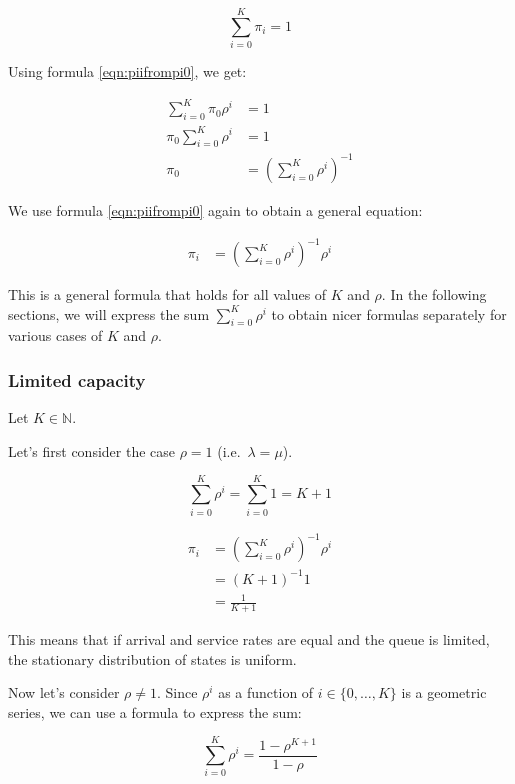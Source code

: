 \documentclass{article}
\begin{document}
\begin{equation}
\sum_{i=0}^K \pi_i = 1
\end{equation}

Using formula \ref{eqn:piifrompi0}, we get:

\begin{align}
\sum_{i=0}^K \pi_0 \rho^i &= 1 \\
\pi_0 \sum_{i=0}^K \rho^i &= 1 \\
\pi_0 &= \left( \sum_{i=0}^K \rho^i \right) ^{-1}
\end{align}

We use formula \ref{eqn:piifrompi0} again to obtain a general equation:

\begin{align}
\pi_i &= \left( \sum_{i=0}^K \rho^i \right)^{-1} \rho^i
\label{eqn:piifromsum}
\end{align}

This is a general formula that holds for all values of $K$ and $\rho$.
In the following sections,
we will express the sum $\sum_{i=0}^K \rho^i$
to obtain nicer formulas separately
for various cases of $K$ and $\rho$.

\subsubsection{Limited capacity}

Let $K \in \mathbb{N}$.

Let's first consider the case $\rho = 1$ (i.e.~$\lambda = \mu$).

\begin{equation}
\sum_{i=0}^K \rho^i = \sum_{i=0}^K 1 = K + 1
\end{equation}

\begin{align}
\pi_i &= \left( \sum_{i=0}^K \rho^i \right)^{-1} \rho^i \\
&= (K+1)^{-1} 1 \\
&= \frac{1}{K+1}
\end{align}

This means that if arrival and service rates are equal and
the queue is limited, the stationary distribution of states is uniform.

Now let's consider $\rho \neq 1$.
Since $\rho^i$ as a function of $i \in \{0, \ldots, K\}$
is a geometric series, we can use
a formula\cite[section Formula]{wiki:geometric} to express the sum:

\begin{equation}
\sum_{i=0}^K \rho^i = \frac{1 - \rho^{K+1}}{1 - \rho}
\end{equation}
\end{document}
